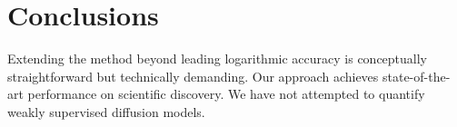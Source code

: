 \section{Conclusions}\label{sec:conclusions}

Extending the method beyond leading logarithmic accuracy is conceptually
straightforward but technically demanding. Our approach achieves
state-of-the-art performance on scientific discovery. We have not
attempted to quantify weakly supervised diffusion models.

